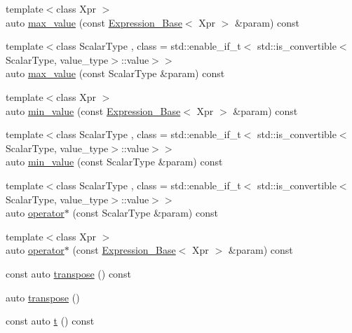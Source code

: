 \begin{DoxyCompactItemize}
\item 
{\footnotesize template$<$class Xpr $>$ }\\auto \hyperlink{classbc_1_1tensors_1_1Expression__Base_a216a776614af590add5560a1a690cc54}{max\+\_\+value} (const \hyperlink{classbc_1_1tensors_1_1Expression__Base}{Expression\+\_\+\+Base}$<$ Xpr $>$ \&param) const
\item 
{\footnotesize template$<$class Scalar\+Type , class  = std\+::enable\+\_\+if\+\_\+t$<$   std\+::is\+\_\+convertible$<$\+Scalar\+Type, value\+\_\+type$>$\+::value$>$$>$ }\\auto \hyperlink{classbc_1_1tensors_1_1Expression__Base_a8e5cab713b7b12c9988a1e1f52e127c1}{max\+\_\+value} (const Scalar\+Type \&param) const
\item 
{\footnotesize template$<$class Xpr $>$ }\\auto \hyperlink{classbc_1_1tensors_1_1Expression__Base_afd86e2e5c075edbe37958a1c10273b2e}{min\+\_\+value} (const \hyperlink{classbc_1_1tensors_1_1Expression__Base}{Expression\+\_\+\+Base}$<$ Xpr $>$ \&param) const
\item 
{\footnotesize template$<$class Scalar\+Type , class  = std\+::enable\+\_\+if\+\_\+t$<$   std\+::is\+\_\+convertible$<$\+Scalar\+Type, value\+\_\+type$>$\+::value$>$$>$ }\\auto \hyperlink{classbc_1_1tensors_1_1Expression__Base_a551cca2012d1b33ad23d6250d24edec9}{min\+\_\+value} (const Scalar\+Type \&param) const
\item 
{\footnotesize template$<$class Scalar\+Type , class  = std\+::enable\+\_\+if\+\_\+t$<$   std\+::is\+\_\+convertible$<$\+Scalar\+Type, value\+\_\+type$>$\+::value$>$$>$ }\\auto \hyperlink{classbc_1_1tensors_1_1Expression__Base_a3dc58dc46cbf3ab826af02f801a4a6d6}{operator$\ast$} (const Scalar\+Type \&param) const
\item 
{\footnotesize template$<$class Xpr $>$ }\\auto \hyperlink{classbc_1_1tensors_1_1Expression__Base_a302938993699cd893b2d88cb6d570451}{operator$\ast$} (const \hyperlink{classbc_1_1tensors_1_1Expression__Base}{Expression\+\_\+\+Base}$<$ Xpr $>$ \&param) const
\item 
const auto \hyperlink{classbc_1_1tensors_1_1Expression__Base_a3420de27f4c595e94648e8d9cbb2afcc}{transpose} () const
\item 
auto \hyperlink{classbc_1_1tensors_1_1Expression__Base_a31d4692717463cd15e43f0bc9c49f3ca}{transpose} ()
\item 
const auto \hyperlink{classbc_1_1tensors_1_1Expression__Base_a9d0a28c277828fc43cc3b352bd73ec00}{t} () const

\end{DoxyCompactItemize}
